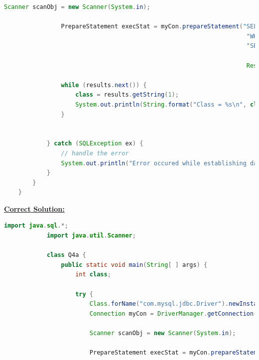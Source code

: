 \documentclass[12pt]{article}
\begin{document}
\begin{enumerate}[1.]
\begin{enumerate}[a)]
\begin{lstlisting}[language=JAVA]
                Scanner scanObj = new Scanner(System.in);

                PrepareStatement execStat = myCon.prepareStatement("SELECT class FROM FROM Classes " +
                                                                    "WHERE numGuns * POWER(bore, 3) >= ALL ( " +
                                                                    "SELECT numGuns * POWER(bore, 3) FROM Classes)");

                                                                    ResultSet results = execStat.executeQuery();

                while (results.next()) {
                    class = results.getString(1);
                    System.out.println(String.format("Class = %s\n", class));
                }


            } catch (SQLException ex) {
                // handle the error
                System.out.println("Error occured while establishing database connection");
            }
        }
    }
    \end{lstlisting}

        \bigskip

        \begin{mdframed}
        \underline{\textbf{Correct Solution:}}

        \bigskip

        \begin{lstlisting}[language=JAVA]
            import java.sql.*;
            import java.util.Scanner;

            class Q4a {
                public static void main(String[ ] args) {
                    int class;

                    try {
                        Class.forName("com.mysql.jdbc.Driver").newInstance();
                        Connection myCon = DriverManager.getConnection("jdbc:mysql://localhost/Q4"); // <- Corrected

                        Scanner scanObj = new Scanner(System.in);

                        PrepareStatement execStat = myCon.prepareStatement("SELECT class FROM FROM Classes " +
                                                                            "WHERE numGuns * POWER(bore, 3) >= ALL ( " +
                                                                            "SELECT numGuns * POWER(bore, 3) FROM Classes)");

                                                                            ResultSet results = execStat.executeQuery();


\end{lstlisting}
\end{mdframed}
\end{enumerate}
\end{enumerate}
\end{document}
